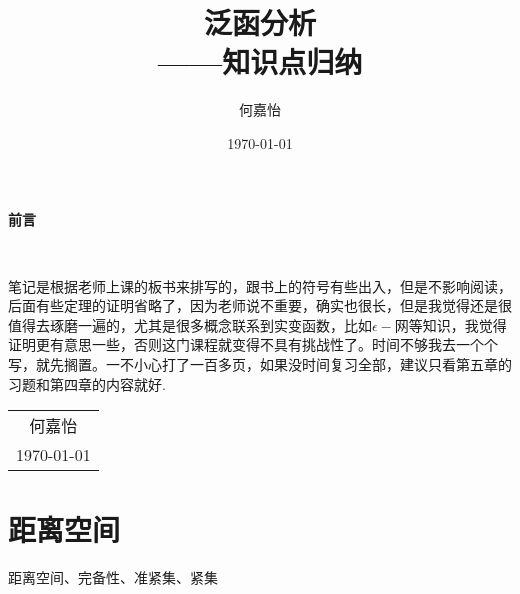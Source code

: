 \documentclass[12pt, a4paper, oneside]{ctexbook}
\title{{\Huge{\textbf{泛函分析}}}\\——知识点归纳}
\author{何嘉怡}
\date{\today}
\begin{document}
	
	\maketitle
	
	\setcounter{page}{1}
	
	\begin{center}
		\Huge\textbf{前言}
	\end{center}~\
	
	笔记是根据老师上课的板书来排写的，跟书上的符号有些出入，但是不影响阅读，后面有些定理的证明省略了，因为老师说不重要，确实也很长，但是我觉得还是很值得去琢磨一遍的，尤其是很多概念联系到实变函数，比如$\epsilon-$网等知识，我觉得证明更有意思一些，否则这门课程就变得不具有挑战性了。时间不够我去一个个写，就先搁置。一不小心打了一百多页，如果没时间复习全部，建议只看第五章的习题和第四章的内容就好.
	~\\
	\begin{flushright}
		\begin{tabular}{c}
			何嘉怡\\
			\today
		\end{tabular}
	\end{flushright}
	
	\newpage
	\setcounter{page}{1}
	\tableofcontents
	\newpage
	\setcounter{page}{1}
	
	\chapter{距离空间}
	距离空间、完备性、准紧集、紧集
\end{document}
